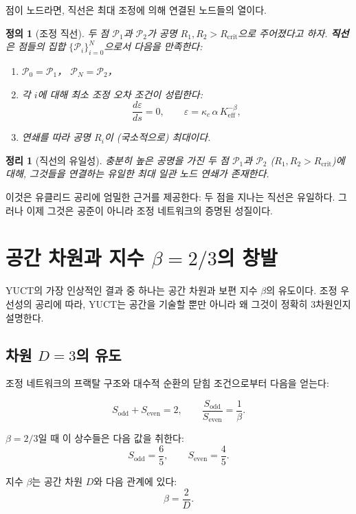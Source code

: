 \documentclass[12pt,a4paper]{article}
\newtheorem{theorem}{정리}
\newtheorem{definition}{정의}
\newcommand{\Keff}{K_{\mathrm{eff}}}
\newcommand{\kappac}{\kappa_c}
\newcommand{\eps}{\varepsilon}
\newcommand{\betaf}{\beta}
\newcommand{\Sodd}{S_{\mathrm{odd}}}
\newcommand{\Seven}{S_{\mathrm{even}}}
\newcommand{\Rcrit}{R_{\mathrm{crit}}}
\newcommand{\calP}{\mathcal{P}}
\begin{document}
	점이 노드라면, 직선은 최대 조정에 의해 연결된 노드들의 열이다.
	
	\begin{definition}[조정 직선]
		두 점 \(\calP_1\)과 \(\calP_2\)가 공명 \(R_1, R_2 > \Rcrit\)으로 주어졌다고 하자. \textbf{직선}은 점들의 집합 \(\{\calP_i\}_{i=0}^{N}\)으로서 다음을 만족한다:
		\begin{enumerate}
			\item \(\calP_0 = \calP_1\)， \(\calP_N = \calP_2\)，
			\item 각 \(i\)에 대해 최소 조정 오차 조건이 성립한다:
			\[
			\frac{d\eps}{ds} = 0, \qquad \eps = \kappac\,\alpha\,\Keff^{-\betaf},
			\]
			\item 연쇄를 따라 공명 \(R_i\)이 (국소적으로) 최대이다.
		\end{enumerate}
	\end{definition}
	
	\begin{theorem}[직선의 유일성]
		충분히 높은 공명을 가진 두 점 \(\calP_1\)과 \(\calP_2\) (\(R_1, R_2 > \Rcrit\))에 대해, 그것들을 연결하는 유일한 최대 일관 노드 연쇄가 존재한다.
	\end{theorem}
	
	이것은 유클리드 공리에 엄밀한 근거를 제공한다: 두 점을 지나는 직선은 유일하다. 그러나 이제 그것은 공준이 아니라 조정 네트워크의 증명된 성질이다.
	
	\section{공간 차원과 지수 \(\betaf = 2/3\)의 창발}
	
	YUCT의 가장 인상적인 결과 중 하나는 공간 차원과 보편 지수 \(\betaf\)의 유도이다. 조정 우선성의 공리에 따라, YUCT는 공간을 기술할 뿐만 아니라 왜 그것이 정확히 3차원인지 설명한다.
	
	\subsection{차원 \(D=3\)의 유도}
	
	조정 네트워크의 프랙탈 구조와 대수적 순환의 닫힘 조건으로부터 다음을 얻는다:
	
	\[
	\Sodd + \Seven = 2, \qquad \frac{\Sodd}{\Seven} = \frac{1}{\betaf}.
	\]
	
	\(\betaf = 2/3\)일 때 이 상수들은 다음 값을 취한다:
	\[
	\Sodd = \frac{6}{5}, \qquad \Seven = \frac{4}{5}.
	\]
	
	지수 \(\betaf\)는 공간 차원 \(D\)와 다음 관계에 있다:
	\[
	\betaf = \frac{2}{D}.
	\]
	
\end{document}
